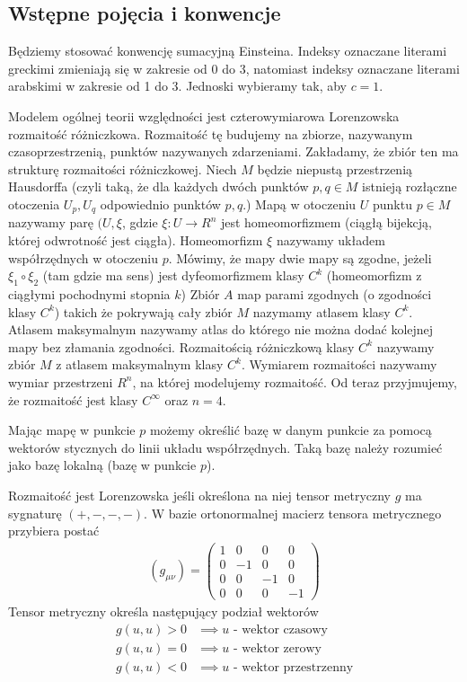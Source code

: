 \subsection{Wstępne pojęcia i konwencje}
Będziemy stosować konwencję sumacyjną Einsteina. Indeksy 
oznaczane literami greckimi zmieniają się w zakresie od 0 do 3, 
natomiast indeksy oznaczane literami arabskimi 
w zakresie od 1 do 3. Jednoski wybieramy tak, aby $c=1$.

Modelem ogólnej teorii względności jest czterowymiarowa Lorenzowska 
rozmaitość różniczkowa. Rozmaitość tę budujemy na 
zbiorze, nazywanym czasoprzestrzenią, punktów nazywanych zdarzeniami. 
Zakładamy, że zbiór ten ma strukturę rozmaitości różniczkowej.
Niech $M$ będzie niepustą przestrzenią Hausdorffa (czyli taką, że
dla każdych dwóch punktów $p,q\in M$ 
istnieją rozłączne otoczenia $U_p,U_q$ odpowiednio punktów $p,q$.) 
Mapą w otoczeniu $U$ punktu $p\in M$ nazywamy parę $(U,\xi$, gdzie  
$\xi : U \to R^n$ jest homeomorfizmem (ciągłą bijekcją, której 
odwrotność jest ciągła). Homeomorfizm $\xi$ nazywamy układem współrzędnych 
w otoczeniu $p$.
Mówimy, że mapy dwie mapy są zgodne, jeżeli $\xi_1 \circ \xi_2$ (tam 
gdzie ma sens)
jest dyfeomorfizmem klasy $C^k$ (homeomorfizm z 
ciągłymi pochodnymi stopnia $k$)
Zbiór $A$ map parami zgodnych (o zgodności klasy $C^k$) 
takich że pokrywają cały zbiór $M$ nazymamy 
atlasem klasy $C^k$. Atlasem maksymalnym nazywamy atlas do którego
nie można dodać kolejnej mapy bez złamania zgodności.
Rozmaitością różniczkową klasy $C^k$ nazywamy 
zbiór $M$ z atlasem maksymalnym klasy $C^k$.
Wymiarem rozmaitości nazywamy wymiar przestrzeni $R^n$, na której 
modelujemy rozmaitość. Od teraz przyjmujemy, że rozmaitość 
jest klasy $C^\infty$ oraz $n=4$.

Mając mapę w punkcie $p$ możemy określić bazę w danym punkcie
za pomocą wektorów stycznych do linii układu współrzędnych.
Taką bazę należy rozumieć jako bazę lokalną (bazę w punkcie $p$).


Rozmaitość jest Lorenzowska jeśli określona na niej tensor
metryczny $g$
 ma sygnaturę $(+,-,-,-)$.
W bazie ortonormalnej macierz tensora metrycznego
przybiera postać 
\begin{align}
( g_{\mu\nu} ) = \left(
\begin{array}{cccc}
1 & 0 & 0 & 0\\
0 & -1 & 0 & 0 \\
0 & 0 & -1 & 0 \\
0 & 0 & 0 & -1 
\end{array}
\right)
\end{align}
Tensor metryczny określa następujący podział wektorów
\begin{align}
g(u,u) > 0& \implies u \text{ - wektor czasowy}\\
g(u,u) = 0& \implies u \text{ - wektor zerowy}\\
g(u,u) < 0& \implies u \text{ - wektor przestrzenny}
\end{align}


